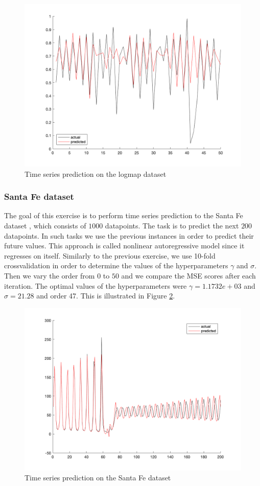 \documentclass[a4paper, 11pt, one column]{article}
\begin{document}
\begin{figure}[H]
    \centering
        \includegraphics[width=12cm]{images/logmap_order_23.png}
    \caption{Time series prediction on the logmap dataset}
    \label{fig:logmap}
\end{figure}

\subsubsection{Santa Fe dataset}
The goal of this exercise is to perform time series prediction to the Santa Fe dataset \cite{articletime}, which consists of $1000$ datapoints. The task is to predict the next $200$ datapoints. In such tasks we use the previous instances in order to predict their future values. This approach is called nonlinear autoregressive model since it regresses on itself. Similarly to the previous exercise, we use 10-fold crossvalidation in order to determine the values of the hyperparameters $\gamma$ and $\sigma$. Then we vary the order from $0$ to $50$ and we compare the MSE scores after each iteration. The optimal values of the hyperparameters were $\gamma=1.1732e+03$ and $\sigma=21.28$ and order 47. This is illustrated in Figure \ref{fig:santafe}. 

\begin{figure}[H]
    \centering
        \includegraphics[width=12cm]{images/santafe_ord_47.png}
    \caption{Time series prediction on the Santa Fe dataset}
    \label{fig:santafe}
\end{figure}
\end{document}
